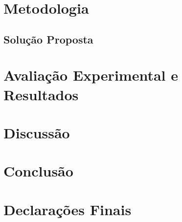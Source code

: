 \documentclass[sigconf]{webmedia}
\begin{document}
\section{Metodologia}
\label{sec:metodo}


\subsection{Solução Proposta}
\label{sec:solucao}


\section{Avaliação Experimental e Resultados}
\label{sec:avaliacao}


\section{Discussão}
\label{sec:discussao}


\section{Conclusão}
\label{sec:conc}


\section*{Declarações Finais}






\end{document}
